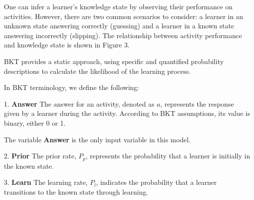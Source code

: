 \documentclass{article}
\begin{document}
One can infer a learner’s knowledge state by observing their performance on activities. However, there are two common scenarios to consider: a learner in an unknown state answering correctly (guessing) and a learner in a known state answering incorrectly (slipping). The relationship between activity performance and knowledge state is shown in Figure 3.

\begin{center}
\end{center}

BKT provides a static approach, using specific and quantified probability descriptions to calculate the likelihood of the learning process.

In BKT terminology, we define the following:

1. \textbf{Answer}  
The answer for an activity, denoted as \( a \), represents the response given by a learner during the activity. According to BKT assumptions, its value is binary, either 0 or 1.

The variable \textbf{Answer} is the only input variable in this model.

2. \textbf{Prior}  
The prior rate, \( P_p \), represents the probability that a learner is initially in the known state.

3. \textbf{Learn}  
The learning rate, \( P_l \), indicates the probability that a learner transitions to the known state through learning.
\end{document}

